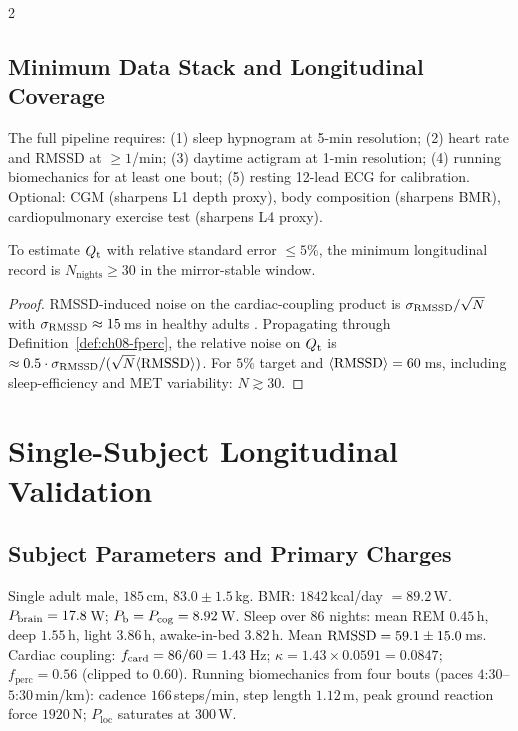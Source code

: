 \begin{multicols}{2}
\subsection{Minimum Data Stack and Longitudinal Coverage}

The full pipeline requires: (1) sleep hypnogram at 5-min resolution; (2) heart rate and RMSSD at $\geq 1$/min; (3) daytime actigram at 1-min resolution; (4) running biomechanics for at least one bout; (5) resting 12-lead ECG for calibration. Optional: CGM (sharpens L1 depth proxy), body composition (sharpens BMR), cardiopulmonary exercise test (sharpens L4 proxy).

\begin{theorem}
\label{thm:ch08-coverage}
To estimate $Q_{\mathrm{t}}$ with relative standard error $\leq 5\%$, the minimum longitudinal record is $N_{\mathrm{nights}} \geq 30$ in the mirror-stable window.
\end{theorem}

\begin{proof}
RMSSD-induced noise on the cardiac-coupling product is $\sigma_{\mathrm{RMSSD}}/\sqrt{N}$ with $\sigma_{\mathrm{RMSSD}} \approx 15$\,ms in healthy adults \citep{shaffer2017}. Propagating through Definition~\ref{def:ch08-fperc}, the relative noise on $Q_{\mathrm{t}}$ is $\approx 0.5\cdot\sigma_{\mathrm{RMSSD}}/(\sqrt{N}\langle\mathrm{RMSSD}\rangle)$. For $5\%$ target and $\langle\mathrm{RMSSD}\rangle = 60$\,ms, including sleep-efficiency and MET variability: $N \gtrsim 30$.
\end{proof}

\section{Single-Subject Longitudinal Validation}
\label{sec:ch08-validation}

\subsection{Subject Parameters and Primary Charges}

Single adult male, $185$\,cm, $83.0 \pm 1.5$\,kg. BMR: $1842$\,kcal/day $= 89.2$\,W. $P_{\mathrm{brain}} = 17.8$\,W; $P_{\mathrm{b}} = P_{\mathrm{cog}} = 8.92$\,W. Sleep over 86 nights: mean REM $0.45$\,h, deep $1.55$\,h, light $3.86$\,h, awake-in-bed $3.82$\,h. Mean $\mathrm{RMSSD} = 59.1 \pm 15.0$\,ms. Cardiac coupling: $f_{\mathrm{card}} = 86/60 = 1.43$\,Hz; $\kappa = 1.43 \times 0.0591 = 0.0847$; $f_{\mathrm{perc}} = 0.56$ (clipped to $0.60$). Running biomechanics from four bouts (paces $4$:$30$--$5$:$30$\,min/km): cadence $166$\,steps/min, step length $1.12$\,m, peak ground reaction force $1920$\,N; $P_{\mathrm{loc}}$ saturates at $300$\,W.


\end{multicols}
